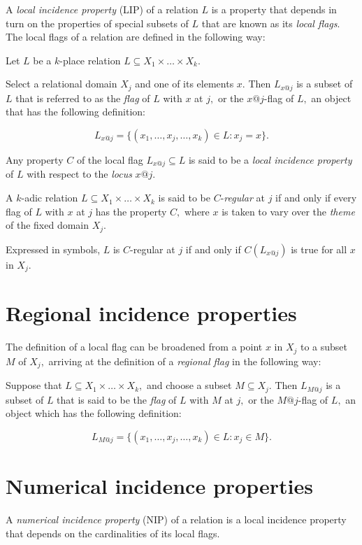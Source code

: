 \documentclass[12pt]{article}
\begin{document}
A \textit{local incidence property} (LIP) of a relation $L$ is a property that depends in turn on the properties of special subsets of $L$ that are known as its \textit{local flags}.  The local flags of a relation are defined in the following way:

Let $L$ be a $k$-place relation $L \subseteq X_1 \times \ldots \times X_k.$

Select a relational domain $X_j$ and one of its elements $x.$  Then $L_{x@j}$ is a subset of $L$ that is referred to as the \textit{flag} of $L$ with $x$ at $j,$ or the $x@j$-flag of $L,$ an object that has the following definition:

\[ L_{x@j} = \{ (x_1, \ldots, x_j, \ldots, x_k) \in L : x_j = x \}. \]

Any property $C$ of the local flag $L_{x@j} \subseteq L$ is said to be a \textit{local incidence property} of $L$ with respect to the \textit{locus} $x @ j.$

A $k$-adic relation $L \subseteq X_1 \times \ldots \times X_k$ is said to be $C$-\textit{regular} at $j$ if and only if every flag of $L$ with $x$ at $j$ has the property $C,$ where $x$ is taken to vary over the \textit{theme} of the fixed domain $X_j.$

Expressed in symbols, $L$ is $C$-regular at $j$ if and only if $C(L_{x@j})$ is true for all $x$ in $X_j.$

\section{Regional incidence properties}

The definition of a local flag can be broadened from a point $x$ in $X_j$ to a subset $M$ of $X_j,$ arriving at the definition of a \textit{regional flag} in the following way:

Suppose that $L \subseteq X_1 \times \ldots \times X_k,$ and choose a subset $M \subseteq X_j.$  Then $L_{M@j}$ is a subset of $L$ that is said to be the \textit{flag} of $L$ with $M$ at $j,$ or the $M@j$-flag of $L,$ an object which has the following  definition:

\[ L_{M@j} = \{ (x_1, \ldots, x_j, \ldots, x_k) \in L : x_j \in M \}. \]

\section{Numerical incidence properties}

A \textit{numerical incidence property} (NIP) of a relation is a local incidence property that depends on the cardinalities of its local flags.
\end{document}
